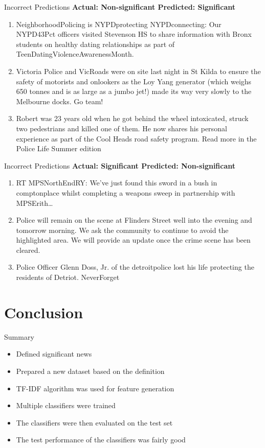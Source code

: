 \documentclass[12pt]{beamer}
\begin{document}
\begin{frame}{Incorrect Predictions}
    \textbf{Actual: Non-significant \hfill Predicted: Significant}
    \begin{enumerate}
        \item NeighborhoodPolicing is NYPDprotecting NYPDconnecting: Our NYPD43Pct officers visited Stevenson HS to share information with Bronx students on healthy dating relationships as part of TeenDatingViolenceAwarenessMonth.
        \item Victoria Police and VicRoads were on site last night in St Kilda to ensure the safety of motorists and onlookers as the Loy Yang generator (which weighs 650 tonnes and is as large as a jumbo jet!) made its way very slowly to the Melbourne docks. Go team!
        \item Robert was 23 years old when he got behind the wheel intoxicated, struck two pedestrians and killed one of them. He now shares his personal experience as part of the Cool Heads road safety program. Read more in the Police Life Summer edition
    \end{enumerate}
\end{frame}

\begin{frame}{Incorrect Predictions}
    \textbf{Actual: Significant \hfill Predicted: Non-significant}
    \begin{enumerate}
        \item RT MPSNorthEndRY: We've just found this sword in a bush in comptonplace whilst completing a weapons sweep in partnership with MPSErith…
        \item Police will remain on the scene at Flinders Street well into the evening and tomorrow morning. We ask the community to continue to avoid the highlighted area. We will provide an update once the crime scene has been cleared.
        \item Police Officer Glenn Doss, Jr. of the detroitpolice lost his life protecting the residents of Detriot. NeverForget
    \end{enumerate}
\end{frame}

\section{Conclusion}

\begin{frame}{Summary}
    \begin{itemize}
        \item Defined significant news
        \item Prepared a new dataset based on the definition
        \item TF-IDF algorithm was used for feature generation
        \item Multiple classifiers were trained
        \item The classifiers were then evaluated on the test set
        \item The test performance of the classifiers was fairly good
    \end{itemize}
\end{frame}
\end{document}
